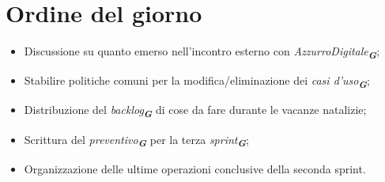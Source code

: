 

\section{Ordine del giorno}

\begin{itemize}
    \item Discussione su quanto emerso nell'incontro esterno con \emph{AzzurroDigitale}\textsubscript{\textit{\textbf{G}}};
    \item Stabilire politiche comuni per la modifica/eliminazione dei \emph{casi d'uso}\textsubscript{\textit{\textbf{G}}};
    \item Distribuzione del \emph{backlog}\textsubscript{\textit{\textbf{G}}} di cose da fare durante le vacanze natalizie;
    \item Scrittura del \emph{preventivo}\textsubscript{\textit{\textbf{G}}} per la terza \emph{sprint}\textsubscript{\textit{\textbf{G}}};
    \item Organizzazione delle ultime operazioni conclusive della seconda sprint.
\end{itemize}
